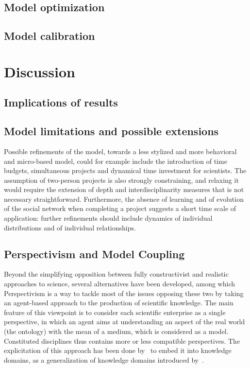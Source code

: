\documentclass[utf8]{frontiersFPHY} %
\begin{document}
\subsection{Model optimization}



\subsection{Model calibration}







\section{Discussion}


\subsection{Implications of results}


\subsection{Model limitations and possible extensions}

Possible refinements of the model, towards a less stylized and more behavioral and micro-based model, could for example include the introduction of time budgets, simultaneous projects and dynamical time investment for scientists. The assumption of two-person projects is also strongly constraining, and relaxing it would require the extension of depth and interdisciplinarity measures that is not necessary straightforward. Furthermore, the absence of learning and of evolution of the social network when completing a project suggests a short time scale of application: further refinements should include dynamics of individual distributions and of individual relationships.


\subsection{Perspectivism and Model Coupling}

Beyond the simplifying opposition between fully constructivist and realistic approaches to science, several alternatives have been developed, among which Perspectivism \cite{giere2010scientific} is a way to tackle most of the issues opposing these two by taking an agent-based approach to the production of scientific knowledge. The main feature of this viewpoint is to consider each scientific enterprise as a single perspective, in which an agent aims at understanding an aspect of the real world (the ontology) with the mean of a medium, which is considered as a model. Constituted disciplines thus contains more or less compatible perspectives. The explicitation of this approach has been done by~\cite{raimbault2017knowledge} to embed it into knowledge domains, as a generalization of knowledge domains introduced by~\cite{livet2010ontology}.
\end{document}
